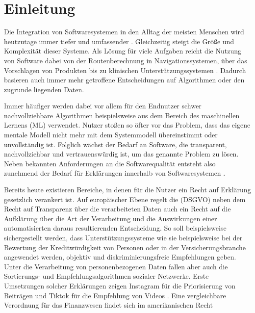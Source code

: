 \chapter{Einleitung}

Die Integration von Softwaresystemen in den Alltag der meisten Menschen wird heutzutage immer tiefer und umfassender \cite{carvalho2020developers}.  Gleichzeitig steigt die Größe und Komplexität dieser Systeme. Als Lösung für viele Aufgaben reicht die Nutzung von Software dabei von der Routenberechnung in Navigationssystemen, über das Vorschlagen von Produkten bis zu klinischen Unterstützungssystemen \cite{chazette2020explainability, tintarev2015explaining, cypko2017guide}. Dadurch basieren auch immer mehr getroffene Entscheidungen auf Algorithmen oder den zugrunde liegenden Daten.

Immer häufiger werden dabei vor allem für den Endnutzer schwer nachvollziehbare Algorithmen beispielsweise aus dem Bereich des maschinellen Lernens (ML) verwendet. Nutzer stoßen so öfter vor das Problem, dass das eigene mentale Modell nicht mehr mit dem Systemmodell übereinstimmt oder unvollständig ist. Folglich wächst der Bedarf an Software, die transparent, nachvollziehbar und vertrauenswürdig ist, um das genannte Problem zu lösen. Neben bekannten Anforderungen an die Softwarequalität \cite{international2011iso} entsteht also zunehmend der Bedarf für Erklärungen innerhalb von Softwaresystemen \cite{chazette_end-users_nodate}.

Bereits heute existieren Bereiche, in denen für die Nutzer ein \glqq Recht auf Erklärung\grqq{} gesetzlich verankert ist. Auf europäischer Ebene regelt die  (DSGVO) \cite{eu_verordnung_2016} neben dem Recht auf Transparenz über die verarbeiteten Daten auch ein Recht auf die Aufklärung über die Art der Verarbeitung und die Auswirkungen einer automatisierten daraus resultierenden Entscheidung. So soll beispielsweise sichergestellt werden, dass Unterstützungssysteme wie sie beispielsweise bei der Bewertung der Kreditwürdigkeit von Personen oder in der Versicherungsbranche angewendet werden, objektiv und diskriminierungsfreie Empfehlungen geben. Unter die Verarbeitung von personenbezogenen Daten fallen aber auch die Sortierungs- und Empfehlungsalgorithmen sozialer Netzwerke. Erste Umsetzungen solcher Erklärungen zeigen Instagram für die Priorisierung von Beiträgen und Tiktok für die Empfehlung von Videos \cite{mosseri_shedding_2021,tiktok_technology_limited_how_2021}. Eine vergleichbare Verordnung für das Finanzwesen findet sich im amerikanischen Recht \cite{cfpb_regulation_2018}

